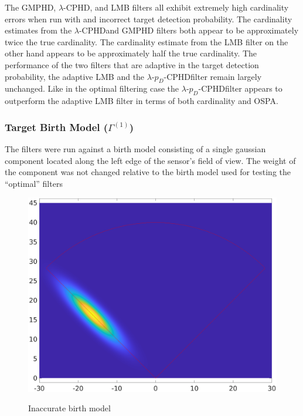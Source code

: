 \documentclass{article}
\newcommand{\lcphd}{$\lambda$-CPHD}
\newcommand{\lpdcphd}{$\lambda$-$p_D$-CPHD}
\begin{document}
The GMPHD, $\lambda$-CPHD, and LMB filters all exhibit extremely high cardinality errors when run with and incorrect target detection probability. The cardinality estimates from the \lcphd and GMPHD filters both appear to be approximately twice the true cardinality. The cardinality estimate from the LMB filter on the other hand appears to be approximately half the true cardinality. The performance of the two filters that are adaptive in the target detection probability, the adaptive LMB and the \lpdcphd filter remain largely unchanged. Like in the optimal filtering case the \lpdcphd filter appears to outperform the adaptive LMB filter in terms of both cardinality and OSPA.

\subsubsection*{Target Birth Model ($\Gamma^{(1)}$)}
The filters were run against a birth model consisting of a single gaussian component located along the left edge of the sensor's field of view. The weight of the component was not changed relative to the birth model used for testing the ``optimal'' filters
\begin{figure}[H]
  \centering
  \includegraphics[width=.75\linewidth]{bad_birth/bm.png}
  \label{fig:birth_model}
  \caption{Inaccurate birth model}
\end{figure}
\end{document}
